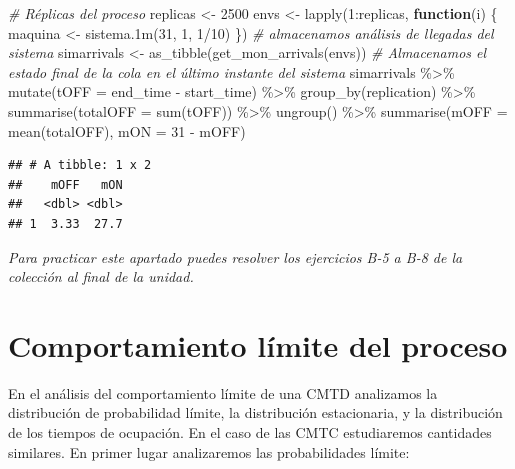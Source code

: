 \documentclass[
]{book}
\newenvironment{Shaded}{\begin{snugshade}}{\end{snugshade}}
\newcommand{\AttributeTok}[1]{\textcolor[rgb]{0.77,0.63,0.00}{#1}}
\newcommand{\CommentTok}[1]{\textcolor[rgb]{0.56,0.35,0.01}{\textit{#1}}}
\newcommand{\ControlFlowTok}[1]{\textcolor[rgb]{0.13,0.29,0.53}{\textbf{#1}}}
\newcommand{\DecValTok}[1]{\textcolor[rgb]{0.00,0.00,0.81}{#1}}
\newcommand{\FunctionTok}[1]{\textcolor[rgb]{0.00,0.00,0.00}{#1}}
\newcommand{\NormalTok}[1]{#1}
\newcommand{\OtherTok}[1]{\textcolor[rgb]{0.56,0.35,0.01}{#1}}
\newcommand{\SpecialCharTok}[1]{\textcolor[rgb]{0.00,0.00,0.00}{#1}}
\theoremstyle{definition}
\theoremstyle{definition}
\theoremstyle{definition}
\theoremstyle{definition}
\theoremstyle{remark}
\begin{document}
\begin{Shaded}
\begin{Highlighting}[]
\CommentTok{\# Réplicas del proceso}
\NormalTok{replicas }\OtherTok{\textless{}{-}} \DecValTok{2500}
\NormalTok{envs }\OtherTok{\textless{}{-}} \FunctionTok{lapply}\NormalTok{(}\DecValTok{1}\SpecialCharTok{:}\NormalTok{replicas, }\ControlFlowTok{function}\NormalTok{(i) \{}
\NormalTok{    maquina }\OtherTok{\textless{}{-}} \FunctionTok{sistema.1m}\NormalTok{(}\DecValTok{31}\NormalTok{, }\DecValTok{1}\NormalTok{, }\DecValTok{1}\SpecialCharTok{/}\DecValTok{10}\NormalTok{)}
\NormalTok{\})}
\CommentTok{\# almacenamos análisis de llegadas del sistema}
\NormalTok{simarrivals }\OtherTok{\textless{}{-}} \FunctionTok{as\_tibble}\NormalTok{(}\FunctionTok{get\_mon\_arrivals}\NormalTok{(envs))}
\CommentTok{\# Almacenamos el estado final de la cola en el último instante del sistema}
\NormalTok{simarrivals }\SpecialCharTok{\%\textgreater{}\%}
  \FunctionTok{mutate}\NormalTok{(}\AttributeTok{tOFF =}\NormalTok{ end\_time }\SpecialCharTok{{-}}\NormalTok{ start\_time) }\SpecialCharTok{\%\textgreater{}\%}
  \FunctionTok{group\_by}\NormalTok{(replication) }\SpecialCharTok{\%\textgreater{}\%}
  \FunctionTok{summarise}\NormalTok{(}\AttributeTok{totalOFF =} \FunctionTok{sum}\NormalTok{(tOFF)) }\SpecialCharTok{\%\textgreater{}\%}
  \FunctionTok{ungroup}\NormalTok{() }\SpecialCharTok{\%\textgreater{}\%}
  \FunctionTok{summarise}\NormalTok{(}\AttributeTok{mOFF =} \FunctionTok{mean}\NormalTok{(totalOFF), }\AttributeTok{mON =} \DecValTok{31} \SpecialCharTok{{-}}\NormalTok{ mOFF)}
\end{Highlighting}
\end{Shaded}

\begin{verbatim}
## # A tibble: 1 x 2
##    mOFF   mON
##   <dbl> <dbl>
## 1  3.33  27.7
\end{verbatim}

\emph{Para practicar este apartado puedes resolver los ejercicios B-5 a B-8 de la colección al final de la unidad.}

\hypertarget{CMTCH}{%
\section{Comportamiento límite del proceso}\label{CMTCH}}

En el análisis del comportamiento límite de una CMTD analizamos la distribución de probabilidad límite, la distribución estacionaria, y la distribución de los tiempos de ocupación. En el caso de las CMTC estudiaremos cantidades similares. En primer lugar analizaremos las probabilidades límite:
\end{document}
